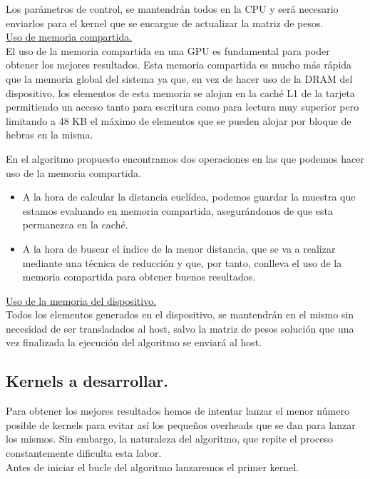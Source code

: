 Los parámetros de control, se mantendrán todos en la CPU y será necesario enviarlos para el kernel que se encargue de actualizar la matriz de pesos.\\

\underline{Uso de memoria compartida.}\\
El uso de la memoria compartida en una GPU es fundamental para poder obtener los mejores resultados. Esta memoria compartida es mucho más rápida que la memoria global del sistema ya que, en vez de hacer uso de la DRAM del dispositivo, los elementos de esta memoria se alojan en la caché L1 de la tarjeta permitiendo un acceso tanto para escritura como para lectura muy superior pero limitando a 48 KB el máximo de elementos que se pueden alojar por bloque de hebras en la misma.

En el algoritmo propuesto encontramos dos operaciones en las que podemos hacer uso de la memoria compartida.

\begin{itemize}
	\item A la hora de calcular la distancia euclídea, podemos guardar la muestra que estamos evaluando en memoria compartida, asegurándonos de que esta permanezca en la caché.
	\item A la hora de buscar el índice de la menor distancia, que se va a realizar mediante una técnica de reducción y que, por tanto, conlleva el uso de la memoria compartida para obtener buenos resultados.
\end{itemize}

\underline{Uso de la memoria del dispositivo.}\\
Todos los elementos generados en el dispositivo, se mantendrán en el mismo sin necesidad de ser transladados al host, salvo la matriz de pesos solución que una vez finalizada la ejecución del algoritmo se enviará al host. \\

\subsection{Kernels a desarrollar.}
Para obtener los mejores resultados hemos de intentar lanzar el menor número posible de kernels para evitar así los pequeños overheads que se dan para lanzar los mismos. Sin embargo, la naturaleza del algoritmo, que repite el proceso constantemente dificulta esta labor. \\

Antes de iniciar el bucle del algoritmo lanzaremos el primer kernel.\\

